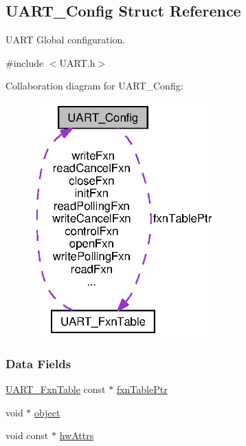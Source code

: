 \subsection{U\+A\+R\+T\+\_\+\+Config Struct Reference}
\label{struct_u_a_r_t___config}


U\+A\+R\+T Global configuration.  




{\ttfamily \#include $<$U\+A\+R\+T.\+h$>$}



Collaboration diagram for U\+A\+R\+T\+\_\+\+Config\+:
\nopagebreak
\begin{figure}[H]
\begin{center}
\leavevmode
\includegraphics[width=199pt]{struct_u_a_r_t___config__coll__graph}
\end{center}
\end{figure}
\subsubsection*{Data Fields}
\begin{DoxyCompactItemize}
\item 
\hyperlink{struct_u_a_r_t___fxn_table}{U\+A\+R\+T\+\_\+\+Fxn\+Table} const $\ast$ \hyperlink{struct_u_a_r_t___config_a9e8073b7f55a5b3bc70d377e3b3f1375}{fxn\+Table\+Ptr}
\item 
void $\ast$ \hyperlink{struct_u_a_r_t___config_a6472bcf07cd2c8ed0045fe01a934f583}{object}
\item 
void const $\ast$ \hyperlink{struct_u_a_r_t___config_ad0baf0ebc820bca98fc7fbd089d1c55c}{hw\+Attrs}
\end{DoxyCompactItemize}


